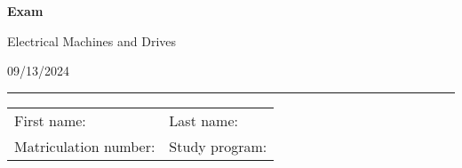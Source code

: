 \begin{center}

    {\vspace{3mm}\Large \textbf{
    \textsf{Exam}}
    \vspace{3mm}
    
    \LARGE
    \textsf{Electrical Machines and Drives}
    
    \vspace{6mm}
    \large
    
    09/13/2024
    \vspace{5mm}
    }
    
    
\end{center}
    
    \hrule
    
    
    \vspace{5mm}
    
\begin{flushleft}
\begin{tabular}{ll}
    First name:  \qquad \qquad \qquad  \qquad \qquad\qquad \qquad \qquad & Last name: \\[1cm]
     Matriculation number: & Study program:
\end{tabular}
\end{flushleft}


